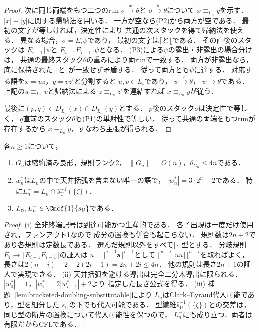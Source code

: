\begin{proof}
次に同じ両端をもつ二つのrun
$\sigma\xrightarrow{x}\theta$と
$\sigma\xrightarrow{y}\theta$について
$x\equiv_{L_n}y$を示す．$|x|+|y|$に関する帰納法を用いる．
一方が空なら(P2)から両方が空である．
最初の文字が等しければ，決定性により
共通の次スタックを得て帰納法を使える．
異なる場合，$\sigma=E_i\psi$であり，
最初の文字は$\lceil$と$\lfloor$である．
その直後のスタックは
$E_{i-1}\rceil\psi$と
$E_{i-1}E_{i-1}\rfloor\psi$となる．
(P3)による$\psi$の露出・非露出の場合分けは，
共通の最終スタック$\theta$の重みにより両runで一致する．
両方が非露出なら，底に保持された
$\rceil$と$\rfloor$が一致せず矛盾する．
従って両方とも$\psi$に達する．
対応する語を$x=uz$，$y=vz'$と分割すると
$u,v\in L_i$であり，
$\psi\xrightarrow{z}\theta$，
$\psi\xrightarrow{z'}\theta$である．
上記の$u\equiv_{L_n}v$と帰納法による
$z\equiv_{L_n}z'$を連結すれば
$x\equiv_{L_n}y$が従う．

最後に$(p,q)\in D_{L_n}(x)\cap D_{L_n}(y)$とする．
$p$後のスタック$\sigma$は決定性で等しく，
$q$直前のスタック$\theta$も(P1)の単射性で等しい．
従って共通の両端をもつrunが存在するから
$x\equiv_{L_n}y$，すなわち主張が得られる．
\end{proof}

\begin{proposition}[倍増言語族の性質]
\label{prop:fanout-one-family}
各$n\ge1$について，
\begin{enumerate}[label=\textup{(\roman*)},leftmargin=*]
\item $G_n$は縮約済み良形，規則ランク2，
$\|G_n\|=O(n)$，$\theta_{G_n}\le4n$である．
\item $w_n^*$は$L_n$の中で天井括弧を含まない唯一の語で，
$|w_n^*|=3\cdot2^n-2$である．
特に$L_n^-=L_n\cap\widehat{s}_{\mathrm U}^{-1}(\{\zeta\})$．
\item $L_n,L_n^-\in\Cmcf{1}{s_{\mathrm U}}$である．
\end{enumerate}
\end{proposition}
\begin{proof}
(i) 全非終端記号は到達可能かつ生産的である．
各子出現は一度だけ使用され，ファンアウト1なので
成分の置換も併合も起こらない．
規則数は$2n+2$であり各規則は定数長である．
選んだ規則以外をすべて$\lceil\cdot\rceil$型とする．
分岐規則$E_i\to\lfloor E_{i-1}E_{i-1}\rfloor$の証人は
$u=\lceil^{i-1}\mathtt a\rceil^{i-1}$として
$\lceil^{n-i}\lfloor uu\rfloor\rceil^{n-i}$を取ればよく，
長さは$2(n-i)+2+2(2i-1)=2n+2i\le4n$．
他の規則は長さ$2n+1$の証人で実現できる．
(ii) 天井括弧を避ける導出は完全二分木導出に限られる．
$|w_0^*|=1$，$|w_i^*|=2|w_{i-1}^*|+2$より
指定した長さ公式を得る．
(iii) 補題~\ref{lem:bracketed-doubling-substitutable}により
$L_n$はClark--Eyraud代入可能であり，型を細分した
$s_{\mathrm U}$の下でも代入可能である．
型繊維$\widehat s_{\mathrm U}^{-1}(\{\zeta\})$との交差は，
同じ型の断片の置換について代入可能性を保つので，
$L_n^-$にも成り立つ．両者は有限だからCFLである．
\end{proof}
